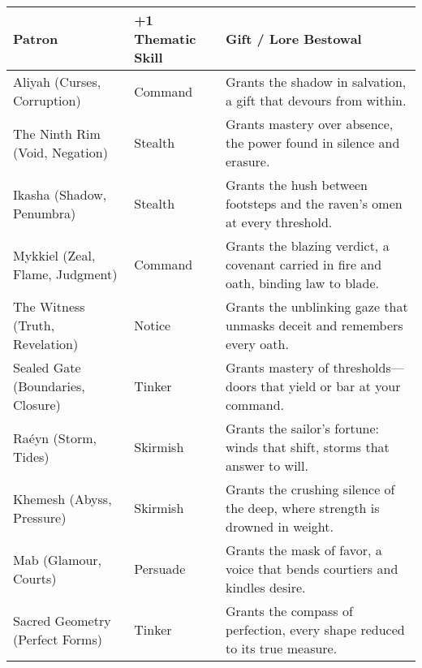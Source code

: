 \newcommand{\PatronGift}[2]{%
\paragraph{Patron's Gift (Imbuement).}
\textbf{Cost: Free, requires a Thaisos}

Once per scene as an action (cost: 1 Boon; requires \textbf{Thiasos}), touch an item to imbue it until scene end with \textbf{+1 Melee} and \textbf{+1 #1}. \emph{Push It:} extend one more scene by marking \textbf{+1 Obligation}. Gifts from the same Patron don’t stack; take the best. Dice bonuses respect the +3 cap. \textit{Domain:} #2.
}
\begin{table}[H]
  \centering
  \renewcommand{\arraystretch}{1.15}
  \begin{tabular}{@{}p{3.8cm}p{3.8cm}p{7.5cm}@{}}
  \toprule
  \textbf{Patron} & \textbf{+1 Thematic Skill} & \textbf{Gift / Lore Bestowal} \\
  \midrule
  Aliyah (Curses, Corruption) & Command & Grants the shadow in salvation, a gift that devours from within. \\
  The Ninth Rim (Void, Negation) & Stealth & Grants mastery over absence, the power found in silence and erasure. \\
  Ikasha (Shadow, Penumbra) & Stealth & Grants the hush between footsteps and the raven's omen at every threshold. \\
  Mykkiel (Zeal, Flame, Judgment) & Command & Grants the blazing verdict, a covenant carried in fire and oath, binding law to blade. \\
  The Witness (Truth, Revelation) & Notice & Grants the unblinking gaze that unmasks deceit and remembers every oath. \\
  Sealed Gate (Boundaries, Closure) & Tinker & Grants mastery of thresholds—doors that yield or bar at your command. \\
  Raéyn (Storm, Tides) & Skirmish & Grants the sailor's fortune: winds that shift, storms that answer to will. \\
  Khemesh (Abyss, Pressure) & Skirmish & Grants the crushing silence of the deep, where strength is drowned in weight. \\
  Mab (Glamour, Courts) & Persuade & Grants the mask of favor, a voice that bends courtiers and kindles desire. \\
  Sacred Geometry (Perfect Forms) & Tinker & Grants the compass of perfection, every shape reduced to its true measure. \\

\end{tabular}
\end{table}
